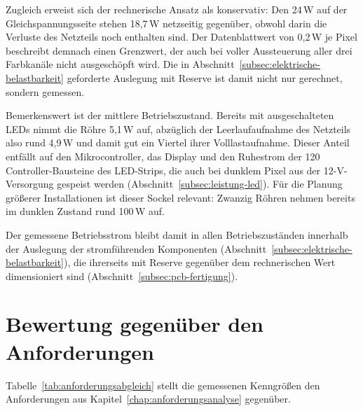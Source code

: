 Zugleich erweist sich der rechnerische Ansatz als konservativ: Den 24\,W auf der
Gleichspannungsseite stehen 18,7\,W netzseitig gegenüber, obwohl darin die
Verluste des Netzteils noch enthalten sind. Der Datenblattwert von 0,2\,W je
Pixel beschreibt demnach einen Grenzwert, der auch bei voller Aussteuerung aller
drei Farbkanäle nicht ausgeschöpft wird. Die in
Abschnitt~\ref{subsec:elektrische-belastbarkeit} geforderte Auslegung mit Reserve
ist damit nicht nur gerechnet, sondern gemessen.

Bemerkenswert ist der mittlere Betriebszustand. Bereits mit ausgeschalteten LEDs
nimmt die Röhre 5,1\,W auf, abzüglich der Leerlaufaufnahme des Netzteils also
rund 4,9\,W und damit gut ein Viertel ihrer Volllastaufnahme. Dieser Anteil
entfällt auf den Mikrocontroller, das Display und den Ruhestrom der 120
Controller-Bausteine des LED-Strips, die auch bei dunklem Pixel aus der
12-V-Versorgung gespeist werden (Abschnitt~\ref{subsec:leistung-led}). Für die
Planung größerer Installationen ist dieser Sockel relevant: Zwanzig Röhren nehmen
bereits im dunklen Zustand rund 100\,W auf.

Der gemessene Betriebsstrom bleibt damit in allen Betriebszuständen innerhalb der
Auslegung der stromführenden Komponenten
(Abschnitt~\ref{subsec:elektrische-belastbarkeit}), die ihrerseits mit Reserve
gegenüber dem rechnerischen Wert dimensioniert sind
(Abschnitt~\ref{subsec:pcb-fertigung}).

\section{Bewertung gegenüber den Anforderungen}
\label{sec:anforderungsabgleich}

Tabelle~\ref{tab:anforderungsabgleich} stellt die gemessenen Kenngrößen den
Anforderungen aus Kapitel~\ref{chap:anforderungsanalyse} gegenüber.

